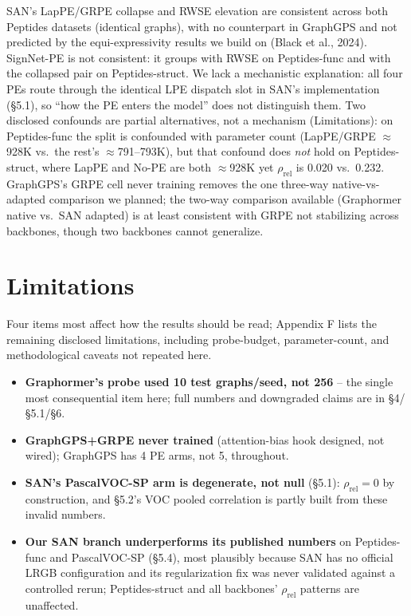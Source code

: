\documentclass[10pt]{article}
\begin{document}
SAN's LapPE/GRPE collapse and RWSE elevation are consistent across both Peptides datasets (identical graphs), with no counterpart in GraphGPS and not predicted by the equi-expressivity results we build on (Black et al., 2024). SignNet-PE is not consistent: it groups with RWSE on Peptides-func and with the collapsed pair on Peptides-struct. We lack a mechanistic explanation: all four PEs route through the identical LPE dispatch slot in SAN's implementation (\S5.1), so ``how the PE enters the model'' does not distinguish them. Two disclosed confounds are partial alternatives, not a mechanism (Limitations): on Peptides-func the split is confounded with parameter count (LapPE/GRPE $\approx$928K vs.\ the rest's $\approx$791--793K), but that confound does \emph{not} hold on Peptides-struct, where LapPE and No-PE are both $\approx$928K yet $\rho_{\text{rel}}$ is 0.020 vs.\ 0.232. GraphGPS's GRPE cell never training removes the one three-way native-vs-adapted comparison we planned; the two-way comparison available (Graphormer native vs.\ SAN adapted) is at least consistent with GRPE not stabilizing across backbones, though two backbones cannot generalize.

\section{Limitations}
Four items most affect how the results should be read; Appendix F lists the remaining disclosed limitations, including probe-budget, parameter-count, and methodological caveats not repeated here.
\begin{itemize}[leftmargin=1.1em, itemsep=0pt, topsep=0.5pt, parsep=0pt]
\item \textbf{Graphormer's probe used 10 test graphs/seed, not 256} -- the single most consequential item here; full numbers and downgraded claims are in \S4/\S5.1/\S6.
\item \textbf{GraphGPS+GRPE never trained} (attention-bias hook designed, not wired); GraphGPS has 4 PE arms, not 5, throughout.
\item \textbf{SAN's PascalVOC-SP arm is degenerate, not null} (\S5.1): $\rho_{\text{rel}}{=}0$ by construction, and \S5.2's VOC pooled correlation is partly built from these invalid numbers.
\item \textbf{Our SAN branch underperforms its published numbers} on Peptides-func and PascalVOC-SP (\S5.4), most plausibly because SAN has no official LRGB configuration and its regularization fix was never validated against a controlled rerun; Peptides-struct and all backbones' $\rho_{\text{rel}}$ patterns are unaffected.
\end{itemize}
\end{document}

